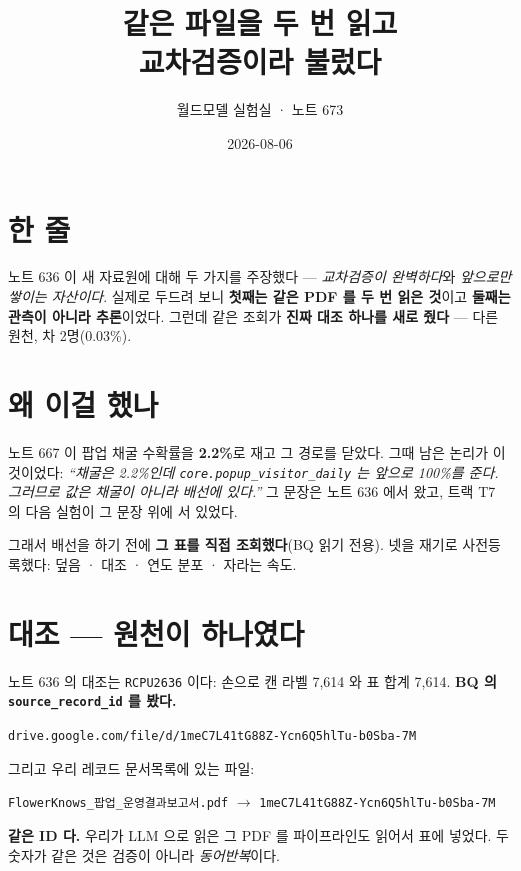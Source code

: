 \documentclass[10pt,a4paper]{article}
\title{\bfseries 같은 파일을 두 번 읽고\\[2pt]
\large 교차검증이라 불렀다}
\author{월드모델 실험실 · 노트 673}
\date{2026-08-06}
\begin{document}
\maketitle

\section{한 줄}

노트 636 이 새 자료원에 대해 두 가지를 주장했다 --- \emph{교차검증이 완벽하다}와
\emph{앞으로만 쌓이는 자산이다}. 실제로 두드려 보니 \textbf{첫째는 같은 PDF 를 두 번
읽은 것}이고 \textbf{둘째는 관측이 아니라 추론}이었다. 그런데 같은 조회가
\textbf{진짜 대조 하나를 새로 줬다} --- 다른 원천, 차 2명(0.03\%).

\section{왜 이걸 했나}

노트 667 이 팝업 채굴 수확률을 \textbf{2.2\%}로 재고 그 경로를 닫았다. 그때 남은
논리가 이것이었다: \emph{``채굴은 2.2\%인데 \texttt{core.popup\_visitor\_daily} 는
앞으로 100\%를 준다. 그러므로 값은 채굴이 아니라 배선에 있다.''} 그 문장은 노트 636
에서 왔고, 트랙 T7 의 다음 실험이 그 문장 위에 서 있었다.

그래서 배선을 하기 전에 \textbf{그 표를 직접 조회했다}(BQ 읽기 전용). 넷을 재기로
사전등록했다: 덮음 · 대조 · 연도 분포 · 자라는 속도.

\section{대조 --- 원천이 하나였다}

노트 636 의 대조는 \verb|RCPU2636| 이다: 손으로 캔 라벨 7,614 와 표 합계 7,614.
\textbf{BQ 의 \texttt{source\_record\_id} 를 봤다.}

\begin{center}
\verb|drive.google.com/file/d/1meC7L41tG88Z-Ycn6Q5hlTu-b0Sba-7M|
\end{center}

그리고 우리 레코드 문서목록에 있는 파일:

\begin{center}
\verb|FlowerKnows_팝업_운영결과보고서.pdf| $\to$
\verb|1meC7L41tG88Z-Ycn6Q5hlTu-b0Sba-7M|
\end{center}

\textbf{같은 ID 다.} 우리가 LLM 으로 읽은 그 PDF 를 파이프라인도 읽어서 표에 넣었다.
두 숫자가 같은 것은 검증이 아니라 \emph{동어반복}이다.
\end{document}
